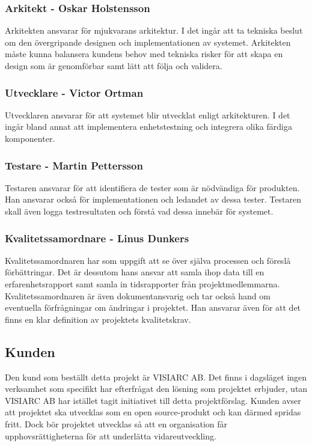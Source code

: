 \subsubsection*{Arkitekt - Oskar Holstensson}
Arkitekten ansvarar för mjukvarans arkitektur. I det ingår att ta tekniska beslut om den övergripande designen och implementationen av systemet. Arkitekten måste kunna balansera kundens behov med tekniska risker för att skapa en design som är genomförbar samt lätt att följa och validera.

\subsubsection*{Utvecklare - Victor Ortman}
Utvecklaren ansvarar för att systemet blir utvecklat enligt arkitekturen. I det ingår bland annat att implementera enhetstestning och integrera olika färdiga komponenter.

\subsubsection*{Testare - Martin Pettersson}
Testaren ansvarar för att identifiera de tester som är nödvändiga för produkten. Han ansvarar också för implementationen och ledandet av dessa tester. Testaren skall även logga testresultaten och förstå vad dessa innebär för systemet.

\subsubsection*{Kvalitetssamordnare - Linus Dunkers}
Kvalitetssamordnaren har som uppgift att se över själva processen och föreslå förbättringar. Det är dessutom hans ansvar att samla ihop data till en erfarenhetsrapport samt samla in tidsrapporter från projektmedlemmarna. Kvalitetssamordnaren är även dokumentansvarig och tar också hand om eventuella förfrågningar om ändringar i projektet. Han ansvarar även för att det finns en klar definition av projektets kvalitetskrav.

\subsection{Kunden}
Den kund som beställt detta projekt är VISIARC AB. Det finns i dagsläget ingen verksamhet som specifikt har efterfrågat den lösning som projektet erbjuder, utan VISIARC AB har istället tagit initiativet till detta projektförslag. Kunden avser att projektet ska utvecklas som en open source-produkt och kan därmed spridas fritt. Dock bör projektet utvecklas så att en organisation får upphovsrättigheterna för att underlätta vidareutveckling.

